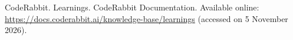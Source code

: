 CodeRabbit. Learnings. CodeRabbit Documentation. Available online: \url{https://docs.coderabbit.ai/knowledge-base/learnings} (accessed on 5 November 2026).
